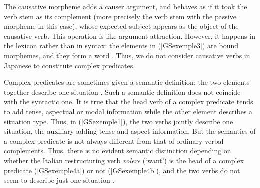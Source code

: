 \documentclass[output=paper]{langsci/langscibook}
\begin{document}
{\begin{exe}
	\label{GSexemple3}
\end{exe}

The causative morpheme adds a causer argument, and behaves as if it took the verb stem as its complement (more precisely the verb stem with the passive morpheme in this case), whose expected subject appears as the object of the causative verb. This operation is like argument attraction. However, it happens in the lexicon rather than in syntax: the elements in (\ref{GSexemple3}) are bound morphemes, and they form a word \citep{manning1999lexical, gunji2012topics}. Thus, we do not consider causative verbs in Japanese to constitute complex predicates.

Complex predicates are sometimes given a semantic definition: the two elements together describe one situation \citep{butt1995structure}. Such a semantic definition does not coincide with the syntactic one. It is true that the head verb of a complex predicate tends to add tense, aspectual or modal information while the other element describes a situation type. Thus, in (\ref{GSexemple1}), the two verbs jointly describe one situation, the auxiliary adding tense and aspect information. But the semantics of a complex predicate is not always different from that of ordinary verbal complements. Thus, there is no evident semantic distinction depending on whether the Italian restructuring verb \textit{volere} (`want') is the head of a complex predicate (\ref{GSexemple4a}) or not (\ref{GSexemple4b}), and the two verbs do not seem to describe just one situation \citep{Monachesi98a}.  

\begin{exe}
	\ex \label{GSexemple4} 
	\begin{xlist}
		
		\label{GSexemple4a}
		
		\label{GSexemple4b} 
		

\end{xlist}
\end{exe}}
\end{document}
